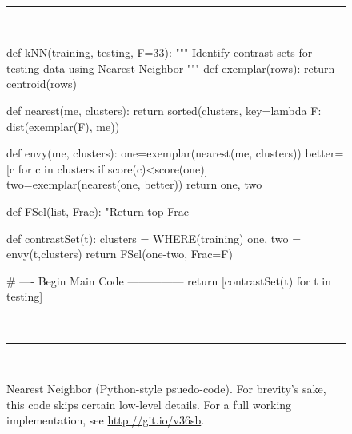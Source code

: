 \begin{figure}[t] 
~\hrule~
\begin{minipage}[t]{.45\linewidth}
\begin{code}[left]
def kNN(training, testing, F=33):
  """ Identify contrast sets for testing
      data using Nearest Neighbor """
  def exemplar(rows):
    return centroid(rows)
  
  def nearest(me, clusters):
    return sorted(clusters,
                  key=lambda F: dist(exemplar(F), me))
  
  def envy(me, clusters):
    one=exemplar(nearest(me, clusters))
    better=[c for c in clusters if score(c)<score(one)]
    two=exemplar(nearest(one, better))
    return one, two
  
  def FSel(list, Frac):
    "Return top Frac %
    
  def contrastSet(t):
    clusters = WHERE(training)
    one, two = envy(t,clusters)
    return FSel(one-two, Frac=F)
  
  # ---- Begin Main Code ---------------
  return [contrastSet(t) for t in testing]
\end{code}
\end{minipage}
~\hrule~
\caption{Nearest Neighbor (Python-style psuedo-code).
For brevity's sake, this code skips certain low-level details.
For a full working implementation, see \url{http://git.io/v36sb}.}
\label{fig:knncode}
\end{figure}